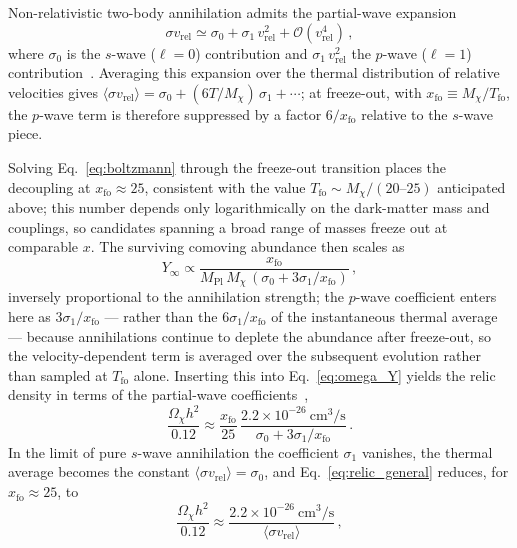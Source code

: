 Non-relativistic two-body annihilation admits the partial-wave expansion
\begin{equation}
	\sigma v_\mathrm{rel} \simeq \sigma_0 + \sigma_1\, v_\mathrm{rel}^2 + \mathcal{O}(v_\mathrm{rel}^4)\,,
	\label{eq:partial_wave}
\end{equation}
where $\sigma_0$ is the $s$-wave ($\ell=0$) contribution and $\sigma_1\, v_\mathrm{rel}^2$ the $p$-wave ($\ell=1$) contribution~\cite{Cirelli:2024ssz}.
Averaging this expansion over the thermal distribution of relative velocities gives $\langle \sigma v_\mathrm{rel}\rangle = \sigma_0 + (6T/M_\chi)\,\sigma_1 + \cdots$; at freeze-out, with $x_\mathrm{fo} \equiv M_\chi/T_\mathrm{fo}$, the $p$-wave term is therefore suppressed by a factor $6/x_\mathrm{fo}$ relative to the $s$-wave piece.

Solving Eq.~\eqref{eq:boltzmann} through the freeze-out transition places the decoupling at $x_\mathrm{fo} \approx 25$, consistent with the value $T_\mathrm{fo} \sim M_\chi/(20\text{--}25)$ anticipated above; this number depends only logarithmically on the dark-matter mass and couplings, so candidates spanning a broad range of masses freeze out at comparable $x$.
The surviving comoving abundance then scales as
\[
	Y_\infty \propto \frac{x_\mathrm{fo}}{M_\mathrm{Pl}\, M_\chi\, (\sigma_0 + 3\sigma_1/x_\mathrm{fo})}\,,
\]
inversely proportional to the annihilation strength; the $p$-wave coefficient enters here as $3\sigma_1/x_\mathrm{fo}$ --- rather than the $6\sigma_1/x_\mathrm{fo}$ of the instantaneous thermal average --- because annihilations continue to deplete the abundance after freeze-out, so the velocity-dependent term is averaged over the subsequent evolution rather than sampled at $T_\mathrm{fo}$ alone.
Inserting this into Eq.~\eqref{eq:omega_Y} yields the relic density in terms of the partial-wave coefficients~\cite{Steigman:2012nb,Cirelli:2024ssz},
\begin{equation}
	\frac{\Omega_\chi h^2}{0.12} \approx \frac{x_\mathrm{fo}}{25}\,\frac{2.2\times 10^{-26}~\mathrm{cm^3/s}}{\sigma_0 + 3\sigma_1/x_\mathrm{fo}}\,.
	\label{eq:relic_general}
\end{equation}
In the limit of pure $s$-wave annihilation the coefficient $\sigma_1$ vanishes, the thermal average becomes the constant $\langle \sigma v_\mathrm{rel}\rangle = \sigma_0$, and Eq.~\eqref{eq:relic_general} reduces, for $x_\mathrm{fo}\approx 25$, to
\begin{equation}
	\frac{\Omega_\chi h^2}{0.12} \approx \frac{2.2 \times 10^{-26}~\mathrm{cm^3/s}}{\langle \sigma v_\mathrm{rel}\rangle}\,,
	\label{eq:relic_abundance}
\end{equation}
